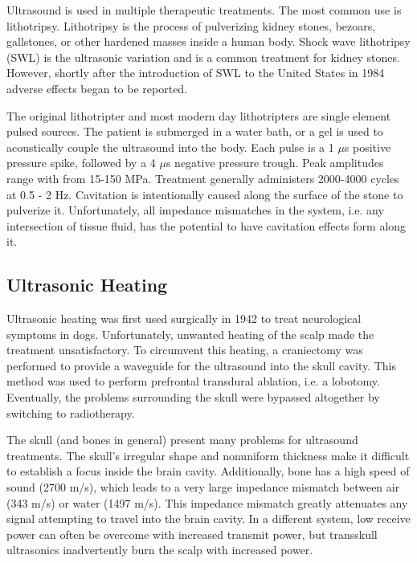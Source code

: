 \documentclass[letter,12pt,titlepage]{article}
\begin{document}
		Ultrasound is used in multiple therapeutic treatments. The most common use is lithotripsy. Lithotripsy is the process of pulverizing kidney stones, bezoars, gallstones, or other hardened masses inside a human body. Shock wave lithotripsy (SWL) is the ultrasonic variation and is a common treatment for kidney stones. However, shortly after the introduction of SWL to the United States in 1984 adverse effects began to be reported. \cite{Bailey_2006}
		
		The original lithotripter and most modern day lithotripters are single element pulsed sources. The patient is submerged in a water bath, or a gel is used to acoustically couple the ultrasound into the body. Each pulse is a 1 ${\mu}$s positive pressure spike, followed by a 4 ${\mu}$s negative pressure trough. Peak amplitudes range with from 15-150 MPa. Treatment generally administers 2000-4000 cycles at 0.5 - 2 Hz. \cite{Bailey_2006} Cavitation is intentionally caused along the surface of the stone to pulverize it. Unfortunately, all impedance mismatches in the system, i.e. any intersection of tissue fluid, has the potential to have cavitation effects form along it.	
				
	\subsection{Ultrasonic Heating}
		
		Ultrasonic heating was first used surgically in 1942 to treat neurological symptoms in dogs. Unfortunately, unwanted heating of the scalp made the treatment unsatisfactory.  To circumvent this heating, a craniectomy was performed to provide a waveguide for the ultrasound into the skull cavity.  This method was used to perform prefrontal transdural ablation, i.e. a lobotomy. Eventually, the problems surrounding the skull were bypassed altogether by switching to radiotherapy. \cite{Marquet_2013}
		
		The skull (and bones in general) present many problems for ultrasound treatments. The skull's irregular shape and nonuniform thickness make it difficult to establish a focus inside the brain cavity. Additionally, bone has a high speed of sound (2700 m/s), which leads to a very large impedance mismatch between air (343 m/s) or water (1497 m/s). This impedance mismatch greatly attenuates any signal attempting to travel into the brain cavity. In a different system, low receive power can often be overcome with increased transmit power, but transskull ultrasonics inadvertently burn the scalp with increased power. \cite{Sun_1998}
	
\end{document}
